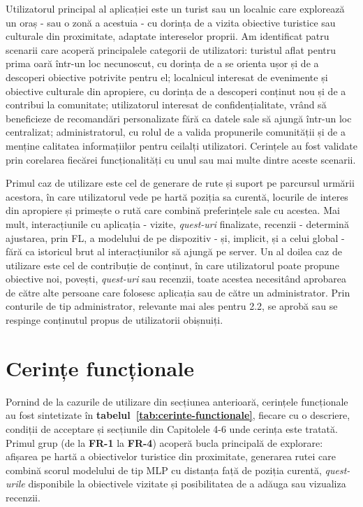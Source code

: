 \documentclass[12pt,a4paper]{report}
\begin{document}
Utilizatorul principal al aplicației este un turist sau un localnic care explorează un oraș - sau o zonă a acestuia - cu dorința de a vizita obiective turistice sau culturale din proximitate, adaptate intereselor proprii. Am identificat patru scenarii care acoperă principalele categorii de utilizatori: turistul aflat pentru prima oară într-un loc necunoscut, cu dorința de a se orienta ușor și de a descoperi obiective potrivite pentru el; localnicul interesat de evenimente și obiective culturale din apropiere, cu dorința de a descoperi conținut nou și de a contribui la comunitate; utilizatorul interesat de confidențialitate, vrând să beneficieze de recomandări personalizate fără ca datele sale să ajungă într-un loc centralizat; administratorul, cu rolul de a valida propunerile comunității și de a menține calitatea informațiilor pentru ceilalți utilizatori. Cerințele au fost validate prin corelarea fiecărei funcționalități cu unul sau mai multe dintre aceste scenarii.

Primul caz de utilizare este cel de generare de rute și suport pe parcursul urmării acestora, în care utilizatorul vede pe hartă poziția sa curentă, locurile de interes din apropiere și primește o rută care combină preferințele sale cu acestea. Mai mult, interacțiunile cu aplicația - vizite, \textit{quest-uri} finalizate, recenzii - determină ajustarea, prin FL, a modelului de pe dispozitiv - și, implicit, și a celui global - fără ca istoricul brut al interacțiunilor să ajungă pe server. Un al doilea caz de utilizare este cel de contribuție de conținut, în care utilizatorul poate propune obiective noi, povești, \textit{quest-uri} sau recenzii, toate acestea necesitând aprobarea de către alte persoane care folosesc aplicația sau de către un administrator. Prin conturile de tip administrator, relevante mai ales pentru 2.2, se aprobă sau se respinge conținutul propus de utilizatorii obișnuiți.

\section{Cerințe funcționale}

Pornind de la cazurile de utilizare din secțiunea anterioară, cerințele funcționale au fost sintetizate în \textbf{tabelul~\ref{tab:cerinte-functionale}}, fiecare cu o descriere, condiții de acceptare și secțiunile din Capitolele 4-6 unde cerința este tratată. Primul grup (de la \textbf{FR-1} la \textbf{FR-4}) acoperă bucla principală de explorare: afișarea pe hartă a obiectivelor turistice din proximitate, generarea rutei care combină scorul modelului de tip MLP cu distanța față de poziția curentă, \textit{quest-urile} disponibile la obiectivele vizitate și posibilitatea de a adăuga sau vizualiza recenzii.
\end{document}
